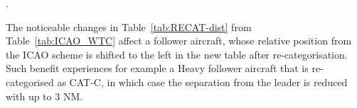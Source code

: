 \begin{table}[h]
\centering
{}
\caption{Transition from ICAO WTC to RECAT-EU categories. The categorisation process and criteria for assigning an existing aircraft type into RECAT-EU scheme is illustrated in detail in~\cite{rooseleer2015recat}}.
\label{tab:wtc2recat_division}
\end{table}

The noticeable changes in Table~\ref{tab:RECAT-dist} from Table~\ref{tab:ICAO_WTC} affect a follower aircraft, whose relative position from the ICAO scheme is shifted to the left in the new table after re-categorisation. Such benefit experiences for example a Heavy follower aircraft that is re-categorised as CAT-C, in which case the separation from the leader is reduced with up to 3 NM. 


